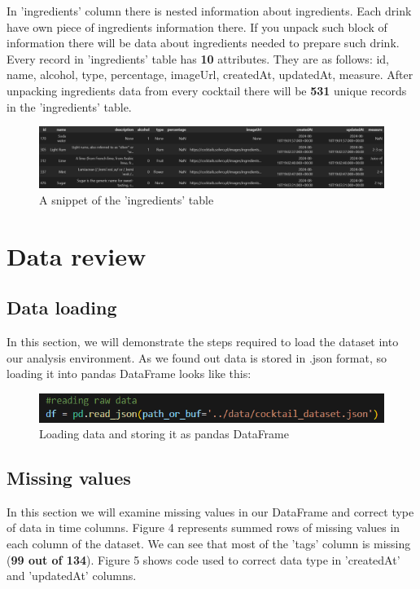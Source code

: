 \documentclass[a4paper]{article}
\begin{document}
In 'ingredients' column there is nested information about ingredients. Each drink have own piece of ingredients information there. If you unpack such block of information there will be data about ingredients needed to prepare such drink. Every record in 'ingredients' table has \textbf{10} attributes. They are as follows: id, name, alcohol, type, percentage, imageUrl, createdAt, updatedAt, measure. After unpacking ingredients data from every cocktail there will be \textbf{531} unique records in the 'ingredients' table.

\begin{figure}[H]
    \centering
    \includegraphics[width=1\linewidth]{ingredients_head.png}
    \caption{A snippet of the 'ingredients' table}
    \label{fig:ingredients_head}
\end{figure}

\section{Data review}
\subsection{Data loading}
In this section, we will demonstrate the steps required to load the dataset into our analysis environment. As we found out data is stored in .json format, so loading it into pandas DataFrame looks like this:
\begin{figure}[H]
    \centering
    \includegraphics[width=1\linewidth]{loading.png}
    \caption{Loading data and storing it as pandas DataFrame}
    \label{fig:enter-label}
\end{figure}

\subsection{Missing values}
In this section we will examine missing values in our DataFrame and correct type of data in time columns. Figure 4 represents summed rows of missing values in each column of the dataset. We can see that most of the 'tags' column is missing (\textbf{99 out of 134}). Figure 5 shows code used to correct data type in 'createdAt' and 'updatedAt' columns.
\vspace{2cm}
\end{document}
